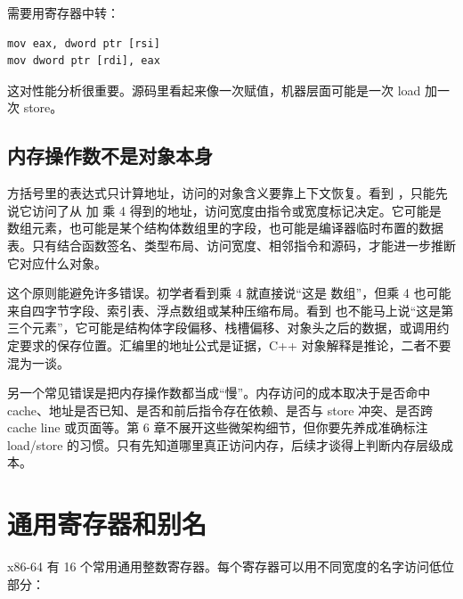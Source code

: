 需要用寄存器中转：

\begin{lstlisting}
mov eax, dword ptr [rsi]
mov dword ptr [rdi], eax
\end{lstlisting}

这对性能分析很重要。源码里看起来像一次赋值，机器层面可能是一次 load 加一次 store。

\subsection{内存操作数不是对象本身}

方括号里的表达式只计算地址，访问的对象含义要靠上下文恢复。看到 ，只能先说它访问了从  加  乘 4 得到的地址，访问宽度由指令或宽度标记决定。它可能是  数组元素，也可能是某个结构体数组里的字段，也可能是编译器临时布置的数据表。只有结合函数签名、类型布局、访问宽度、相邻指令和源码，才能进一步推断它对应什么对象。

这个原则能避免许多错误。初学者看到乘 4 就直接说“这是  数组”，但乘 4 也可能来自四字节字段、索引表、浮点数组或某种压缩布局。看到  也不能马上说“这是第三个元素”，它可能是结构体字段偏移、栈槽偏移、对象头之后的数据，或调用约定要求的保存位置。汇编里的地址公式是证据，C++ 对象解释是推论，二者不要混为一谈。

另一个常见错误是把内存操作数都当成“慢”。内存访问的成本取决于是否命中 cache、地址是否已知、是否和前后指令存在依赖、是否与 store 冲突、是否跨 cache line 或页面等。第 6 章不展开这些微架构细节，但你要先养成准确标注 load/store 的习惯。只有先知道哪里真正访问内存，后续才谈得上判断内存层级成本。

\section{通用寄存器和别名}

x86-64 有 16 个常用通用整数寄存器。每个寄存器可以用不同宽度的名字访问低位部分：


